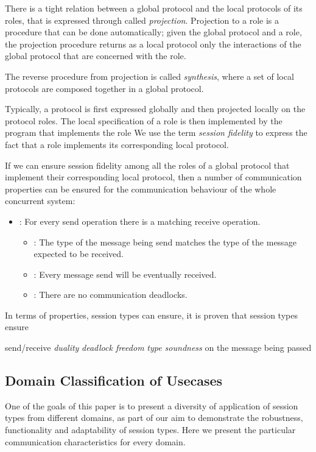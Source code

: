 There is a tight relation between a global protocol and the
local protocols of its roles, that is expressed
through called {\em projection}.
Projection to a role is a procedure that can be done automatically;
given the global protocol and a role, the projection 
procedure returns as a local protocol only the
interactions of the global protocol that are concerned with
the role.

The reverse procedure from projection is called {\em synthesis},
where a set of local protocols are composed together in a global
protocol.

Typically, a protocol is first expressed globally and then
projected locally on the protocol roles.
The local specification of a role is then
implemented by the program that implements the role
We use the term {\em session fidelity} to express the fact
that a role implements its corresponding local protocol.

If we can ensure session fidelity among all the roles of a
global protocol that implement their corresponding local protocol,
then a number of communication properties can be ensured
for the communication behaviour of the whole concurrent
system:
\begin{itemize}
	\item	{\em }:	For every send operation there is a matching receive operation.
	\begin{itemize}
		\item	{\em }: The type of the message being send matches the type of
						the message expected to be received.
		\item	{\em }:	Every message send will be eventually received.
		\item	{\em }: There are no communication deadlocks.
	\end{itemize}

\end{itemize}


In terms of properties, session types can ensure, it is proven
that session types ensure

send/receive {\em duality}
{\em deadlock freedom}
{\em type soundness} on the message being passed




\subsection{Domain Classification of Usecases}

One of the goals of this paper is to present a diversity
of application of session types from different domains, as
part of our aim to demonstrate the robustness, functionality
and adaptability of session types. Here we present the particular
communication characteristics for every domain.

